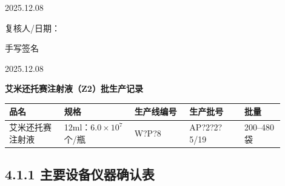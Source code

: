\documentclass[UTF8,10pt,a4paper,fontset=fandol]{ctexart}
\newcommand{\fieldvalue}[1]{#1}
\newcommand{\handwritten}[1]{#1}
\begin{document}
\fieldvalue{\handwritten{2025.12.08}}

\hfill 复核人/日期：

\fieldvalue{\handwritten{手写签名}}

\fieldvalue{\handwritten{2025.12.08}}


\newpage

\begin{center}
\textbf{艾米还托赛注射液（Z2）批生产记录}
\end{center}

\begin{tabular}{|p{0.18\linewidth}|p{0.23\linewidth}|p{0.18\linewidth}|p{0.18\linewidth}|p{0.13\linewidth}|}
\hline
品名 & 规格 & 生产线编号 & 生产批号 & 批量 \\
\hline
\fieldvalue{艾米还托赛注射液} &
\fieldvalue{12ml：$6.0\times10^{7}$个/瓶} &
\fieldvalue{\handwritten{W?P?8}} &
\fieldvalue{\handwritten{AP?2?2?5/19}} &
\fieldvalue{200--480 袋} \\
\hline
\end{tabular}

\subsection*{4.1.1 主要设备仪器确认表}
\end{document}
